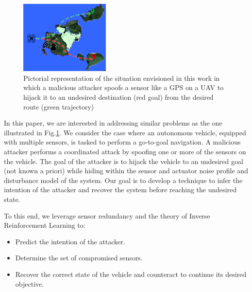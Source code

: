 \documentclass[letterpaper, 10 pt, conference]{ieeeconf}  %
\begin{document}
\begin{figure}[t]
\centering
\includegraphics[width=0.4\textwidth]{problem}
\caption{Pictorial representation of the situation envisioned in this work in which a malicious attacker spoofs a sensor like a GPS on a UAV to hijack it to an undesired destination (red goal) from the desired route (green trajectory)}
 \label{fig:problem}
\end{figure}


In this paper, we are interested in addressing similar problems as the one illustrated in Fig.\ref{fig:problem}. We consider the case where an autonomous vehicle, equipped with multiple sensors, is tasked to perform a go-to-goal navigation. 
A malicious attacker performs a coordinated attack by spoofing one or more of the sensors on the vehicle. The goal of the attacker is to hijack the vehicle to an undesired goal (not known a priori) while hiding within the sensor and actuator noise profile and disturbance model of the system. 
Our goal is to develop a technique to infer the intention of the attacker and recover the system before reaching the undesired state. 


To this end, we leverage sensor redundancy and the theory of Inverse Reinforcement Learning to:
\begin{itemize}
    \item Predict the intention of the attacker.
    \item Determine the set of compromised sensors.
    \item Recover the correct state of the vehicle and counteract to continue its desired objective. 
\end{itemize}
\end{document}
